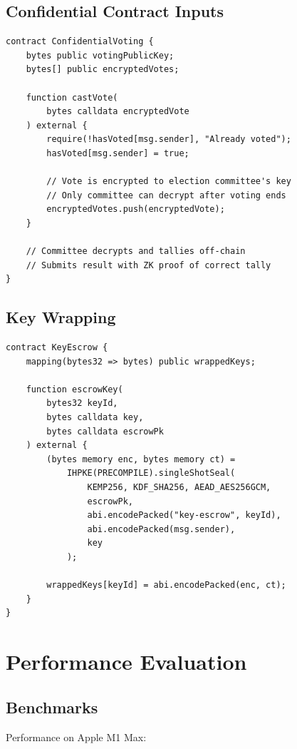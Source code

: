 \documentclass[11pt,a4paper]{article}
\theoremstyle{definition}
\begin{document}
\subsection{Confidential Contract Inputs}

\begin{lstlisting}[language=Solidity]
contract ConfidentialVoting {
    bytes public votingPublicKey;
    bytes[] public encryptedVotes;

    function castVote(
        bytes calldata encryptedVote
    ) external {
        require(!hasVoted[msg.sender], "Already voted");
        hasVoted[msg.sender] = true;

        // Vote is encrypted to election committee's key
        // Only committee can decrypt after voting ends
        encryptedVotes.push(encryptedVote);
    }

    // Committee decrypts and tallies off-chain
    // Submits result with ZK proof of correct tally
}
\end{lstlisting}

\subsection{Key Wrapping}

\begin{lstlisting}[language=Solidity]
contract KeyEscrow {
    mapping(bytes32 => bytes) public wrappedKeys;

    function escrowKey(
        bytes32 keyId,
        bytes calldata key,
        bytes calldata escrowPk
    ) external {
        (bytes memory enc, bytes memory ct) =
            IHPKE(PRECOMPILE).singleShotSeal(
                KEMP256, KDF_SHA256, AEAD_AES256GCM,
                escrowPk,
                abi.encodePacked("key-escrow", keyId),
                abi.encodePacked(msg.sender),
                key
            );

        wrappedKeys[keyId] = abi.encodePacked(enc, ct);
    }
}
\end{lstlisting}

\section{Performance Evaluation}

\subsection{Benchmarks}

Performance on Apple M1 Max:
\end{document}
